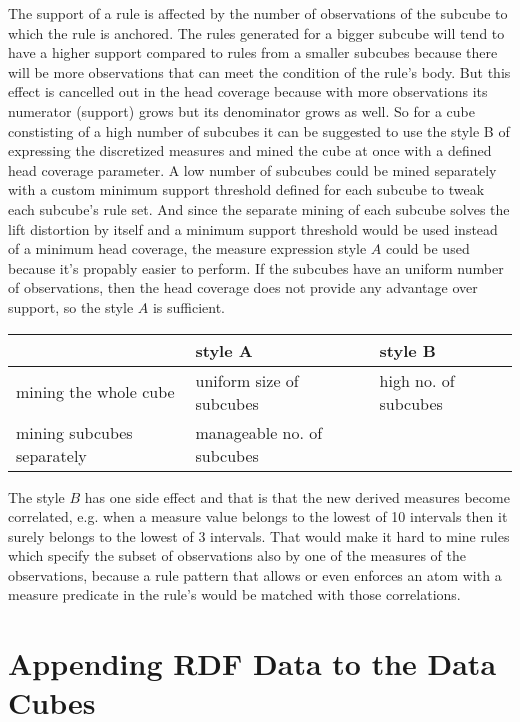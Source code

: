 The support of a rule is affected by the number of observations of the subcube to which the rule is anchored. The rules generated for a bigger subcube will tend to have a higher support compared to rules from a smaller subcubes because there will be more observations that can meet the condition of the rule's body. But this effect is cancelled out in the head coverage because with more observations its numerator (support) grows but its denominator grows as well. So for a cube constisting of a high number of subcubes it can be suggested to use the style B of expressing the discretized measures and mined the cube at once with a defined head coverage parameter. A low number of subcubes could be mined separately with a custom minimum support threshold defined for each subcube to tweak each subcube's rule set. And since the separate mining of each subcube solves the lift distortion by itself and a minimum support threshold would be used instead of a minimum head coverage, the measure expression style $A$ could be used because it's propably easier to perform. If the subcubes have an uniform number of observations, then the head coverage does not provide any advantage over support, so the style $A$ is sufficient.

\begin{table}[h]
\centering
\begin{tabular}{l|ll}
                           & style A                       & style B                  \\ 
\hline
mining the whole cube      & uniform size of subcubes                              & high no. of subcubes  \\
mining subcubes separately & manageable no. of subcubes &                         
\end{tabular}
\end{table}

The style $B$ has one side effect and that is that the new derived measures become correlated, e.g. when a measure value belongs to the lowest of 10 intervals then it surely belongs to the lowest of 3 intervals. That would make it hard to mine rules which specify the subset of observations also by one of the measures of the observations, because a rule pattern that allows or even enforces an atom with a measure predicate in the rule's would be matched with those correlations.

\section{Appending RDF Data to the Data Cubes}

